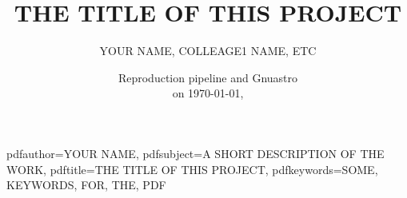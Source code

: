 


\usepackage[a4paper, includeheadfoot, body={18.7cm, 24.5cm}]{geometry}




\setlength{\columnsep}{0.75cm}





\renewcommand{\topfraction}{.99}
\renewcommand{\bottomfraction}{.7}
\renewcommand{\textfraction}{.05}
\renewcommand{\floatpagefraction}{.99}
\renewcommand{\dbltopfraction}{.99}
\renewcommand{\dblfloatpagefraction}{.99}
\setcounter{topnumber}{1}
\setcounter{bottomnumber}{0}
\setcounter{totalnumber}{2}
\setcounter{dbltopnumber}{1}



\usepackage{xcolor}
\color{black}                   %


\usepackage{fixltx2e}



\usepackage{setspace, caption}
\setlength{\abovecaptionskip}{3pt plus 1pt minus 1pt}



\usepackage[hang]{footmisc}
\setlength\footnotemargin{10pt}



\usepackage{datetime}



\usepackage[
  colorlinks,
  urlcolor=blue,
  citecolor=blue,
  linkcolor=blue,
  linktocpage]{hyperref}
\renewcommand\UrlFont{\rmfamily}



\hypersetup
{
    pdfauthor={YOUR NAME},
    pdfsubject={A SHORT DESCRIPTION OF THE WORK},
    pdftitle={THE TITLE OF THIS PROJECT},
    pdfkeywords={SOME, KEYWORDS, FOR, THE, PDF}
}



\title{THE TITLE OF THIS PROJECT}
\author{YOUR NAME, COLLEAGE1 NAME, ETC}
\date{\small Reproduction pipeline \pipelineversion{}
      and Gnuastro \gnuastroversion\\on \today, \currenttime}
